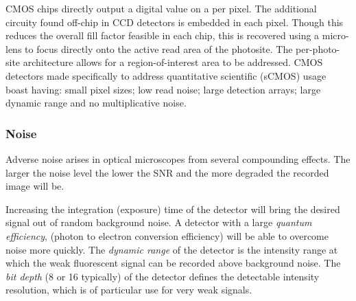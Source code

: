 \gls{CMOS} chips directly output a digital value on a per pixel.
The additional circuity found off-chip in \gls{CCD} detectors is embedded in each pixel.
Though this reduces the overall fill factor feasible in each chip, this is recovered using a micro-lens to focus directly onto the active read area of the \gls{photosite}.
The per-photo-site architecture allows for a region-of-interest area to be addressed.
CMOS detectors made specifically to address quantitative scientific (\gls{sCMOS}) usage boast having: small pixel sizes; low read noise; large detection arrays; large dynamic range and no multiplicative noise.



\subsubsection{Noise}

Adverse noise arises in optical microscopes from several compounding effects.
The larger the noise level the lower the \gls{SNR} and the more degraded the recorded image will be.

Increasing the integration (exposure) time of the detector will bring the desired signal out of random background noise.
A detector with a large \emph{\gls{quantum efficiency}}, (photon to electron conversion efficiency) will be able to overcome noise more quickly.
The \emph{\gls{dynamic range}} of the detector is the intensity range at which the weak fluorescent signal can be recorded above background noise.
The \emph{\gls{bit depth}} (8 or \SI{16}{\bit} typically) of the detector defines the detectable intensity resolution, which is of particular use for very weak signals.

